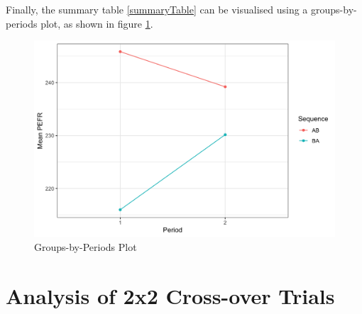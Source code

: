 \documentclass[12pt, TexShade, letterpaper]{report}
\begin{document}
Finally, the summary table \ref{summaryTable} can be visualised using a groups-by-periods plot, as shown in figure \ref{fig:groupsbyperiods}.
\begin{figure}[ht]
    \centering
    \includegraphics[width=0.85\linewidth]{report/figures/groupsByPeriodsPlot.png}
    \caption{Groups-by-Periods Plot}
    \label{fig:groupsbyperiods}
\end{figure}

\chapter{Analysis of 2x2 Cross-over Trials}
\end{document}
